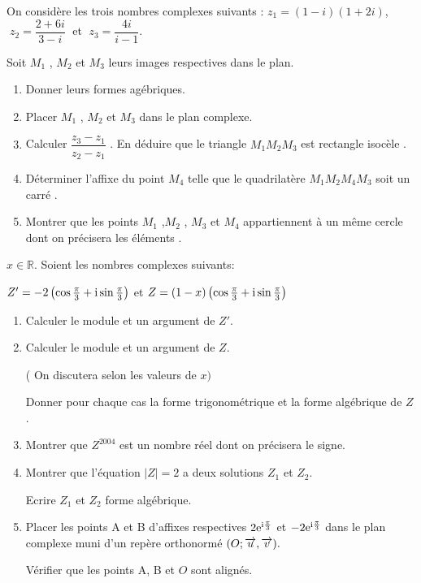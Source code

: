 \begin{exercice}
On consid\`ere les trois nombres complexes suivants : $z_{1} =(1 - i)(1+2i)$, $\;z_{2}=\dfrac{2 +6i}{3-i}\;$  et $ \;z_{3}=\dfrac{4i}{i-1} $.
\medskip

 Soit $ M_{1} $ , $ M_{2} $ et  $ M_{3} $  leurs images respectives dans le plan.
 \begin{enumerate}
 \item  Donner leurs formes ag\'ebriques. 
 \item  Placer  $ M_{1} $ , $ M_{2} $  et  $ M_{3} $ dans le plan complexe.
 \item Calculer  $\dfrac{z_{3} -z_{1}}{z_{2} -z_{1}}$ .  En d\'eduire que le triangle   $ M_{1} $$ M_{2} $$ M_{3}$  est rectangle isoc\`ele  . 
 \item   D\'eterminer l'affixe du point $ M_{4} $ telle  que le quadrilat\`ere  $ M_{1}M_{2}  M_{4} M_{3}$  soit un carr\'e .
 \item Montrer que les points $ M_{1} $ ,$ M_{2} $ , $ M_{3}$   et  $ M_{4} $  appartiennent \`a  un m\^eme cercle dont on pr\'ecisera les  \'el\'ements .
 \end{enumerate}

\end{exercice}

\begin{exercice}
 $ x\in\mathbb{R} $. Soient les nombres complexes suivants:
\medskip

$ Z'= -2\left(\cos \frac{\pi}{3}+\text{i}\sin\frac{\pi}{3}\right) $ et $ Z= (1-x)\left(\cos \frac{\pi}{3}+\text{i}\sin\frac{\pi}{3}\right) $
\begin{enumerate}
\item Calculer le module et un argument de $ Z' $.
\item Calculer le module et un argument de $ Z $.

( On discutera selon les valeurs de $ x) $


Donner pour chaque cas la forme trigonométrique et la forme algébrique de  $ Z $.
\item Montrer que $ Z^{2004} $ est un nombre réel dont on précisera le signe.
\item Montrer que l'équation  $ |Z|=2 $ a deux solutions $ Z_1$ et $ Z_2$.

Ecrire  $ Z_1$ et $ Z_2$ forme algébrique.
\item Placer  les points A et B d'affixes respectives $ 2\text{e}^{\text{i}\frac{\pi}{3}} $  et $ -2\text{e}^{\text{i}\frac{\pi}{3}} $ dans le plan complexe muni d'un repère orthonormé $ (O ;\overrightarrow{u},\overrightarrow{v}). $

Vérifier que les points A, B et $ O $ sont alignés.
\end{enumerate}
\end{exercice}

